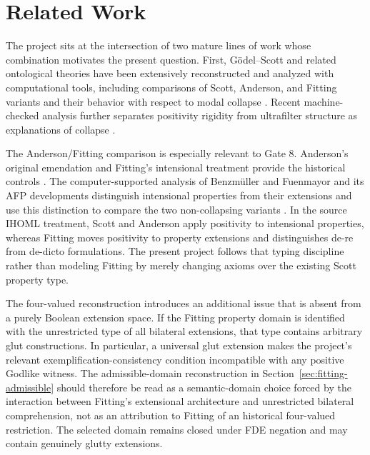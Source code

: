 \section{Related Work}
\label{sec:related}

The project sits at the intersection of two mature lines of work whose combination motivates the present question. First, G\"odel--Scott and related ontological theories have been extensively reconstructed and analyzed with computational tools, including comparisons of Scott, Anderson, and Fitting variants and their behavior with respect to modal collapse \cite{BenzmuellerScott2025,BenzmuellerFuenmayor2019}. Recent machine-checked analysis further separates positivity rigidity from ultrafilter structure as explanations of collapse \cite{Benzmueller2026Collapse}.

The Anderson/Fitting comparison is especially relevant to Gate 8. Anderson's original emendation and Fitting's intensional treatment provide the historical controls \cite{Anderson1990,Fitting2002}. The computer-supported analysis of Benzm\"uller and Fuenmayor and its AFP developments distinguish intensional properties from their extensions and use this distinction to compare the two non-collapsing variants \cite{BenzmuellerFuenmayor2019,FuenmayorBenzmuellerAFP,BenzmuellerScottAFP2025}. In the source IHOML treatment, Scott and Anderson apply positivity to intensional properties, whereas Fitting moves positivity to property extensions and distinguishes de-re from de-dicto formulations. The present project follows that typing discipline rather than modeling Fitting by merely changing axioms over the existing Scott property type.

The four-valued reconstruction introduces an additional issue that is absent from a purely Boolean extension space. If the Fitting property domain is identified with the unrestricted type of all bilateral extensions, that type contains arbitrary glut constructions. In particular, a universal glut extension makes the project's relevant exemplification-consistency condition incompatible with any positive Godlike witness. The admissible-domain reconstruction in Section~\ref{sec:fitting-admissible} should therefore be read as a semantic-domain choice forced by the interaction between Fitting's extensional architecture and unrestricted bilateral comprehension, not as an attribution to Fitting of an historical four-valued restriction. The selected domain remains closed under FDE negation and may contain genuinely glutty extensions.

